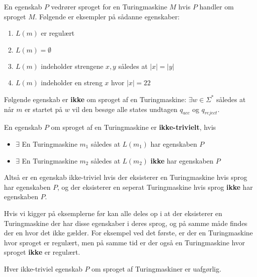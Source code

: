 En egenskab $P$ vedrører sproget for en Turingmaskine $M$ hvis $P$ handler om sproget $M$. Følgende er eksempler på sådanne egenskaber:
\begin{enumerate}
  \item $L(m)$ er regulært
  \item $L(m) = \emptyset$
  \item $L(m)$ indeholder strengene $x,y$ således at $|x| = |y|$
  \item $L(m)$ indeholder en streng $x$ hvor $|x| = 22$
\end{enumerate}
Følgende egenskab er \textbf{ikke} om sproget af en Turingmaskine: $\exists w \in \Sigma^{*}$ således at når $m$ er startet på $w$ vil den besøge alle states undtagen $q_{acc}$ og $q_{reject}$.

\begin{definition}
  En egenskab $P$ om sproget af en Turingmaskine er \textbf{ikke-trivielt}, hvis
  \begin{itemize}


	\item $\exists$ En Turingmaskine $m_{1}$ således at $L(m_{1})$ har egenskaben $P$
	\item $\exists$ En Turingmaskine $m_{2}$ således at $L(m_{2})$ \textbf{ikke} har egenskaben $P$
  \end{itemize}

\end{definition}

  Altså er en egenskab ikke-triviel hvis der eksisterer en Turingmaskine hvis sprog har egenskaben $P$, og der eksisterer en seperat Turingmaskine hvis sprog \textbf{ikke} har egenskaben $P$.

  Hvis vi kigger på eksemplerne før kan alle deles op i at der eksisterer en Turingmaskine der har disse egenskaber i deres sprog, og på samme måde findes der en hvor det ikke gælder. For eksempel ved det første, er der en Turingmaskine hvor sproget er regulært, men på samme tid er der også en Turingmaskine hvor sproget \textbf{ikke} er regulært.

\begin{theorem}
Hver ikke-triviel egenskab $P$ om sproget af Turingmaskiner er uafgørlig.
\end{theorem}



